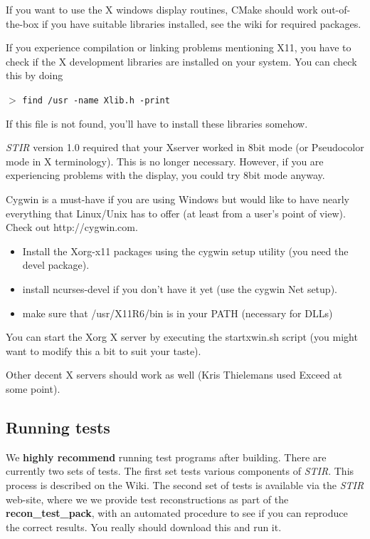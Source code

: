 \documentclass{article}
\newcommand{\cmdline}[1]{\par \noindent $>$ \texttt{#1}\par}
\begin{document}
If you want to use the X windows display routines,  CMake
should work out-of-the-box if you have suitable libraries installed, see the wiki
for required packages.

{ 
}

If you experience compilation 
or linking problems mentioning X11, you have to check if the 
X development libraries are installed on your system. You can 
check this by doing
\cmdline{find /usr -name Xlib.h -print}

If this file is not found, you'll have to install these libraries 
somehow.

{ 
}

\textit{STIR} version 1.0 required that your Xserver worked in 8bit 
mode (or Pseudocolor mode in X terminology). This is no longer 
necessary. However, if you are experiencing problems with the 
display, you could try 8bit mode anyway.



{ 
}

Cygwin is a must-have if you are using Windows but would like 
to have nearly everything that Linux/Unix has to offer (at least 
from a user's point of view). Check out http://cygwin.com.

{ 
}
\begin{itemize}
\item Install the Xorg-x11 packages using the cygwin setup utility 
(you need the devel package).
\item 
install ncurses-devel if you don't have it yet (use the cygwin 
Net setup).
\item make sure that /usr/X11R6/bin is in your PATH (necessary 
for DLLs)
\end{itemize}

You can start the Xorg X server by executing the startxwin.sh 
script (you might want to modify this a bit to suit your taste). 

Other decent X servers should work as well (Kris Thielemans used Exceed at 
some point).


\subsection{
Running tests}

We \textbf{highly recommend} running test programs after building. There are currently two
sets of tests. The first set tests various components of \textit{STIR}. This process is described on the Wiki.
The second set of tests is available via the \textit{STIR} web-site, where we 
we provide test reconstructions as part of the
\textbf{recon\_test\_pack}, with an 
automated procedure to see if you can reproduce the correct results. 
You really should download this and run it.
\end{document}
